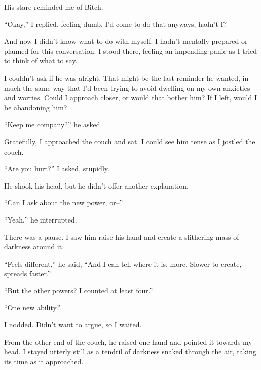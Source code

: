 His stare reminded me of Bitch.



``Okay,'' I replied, feeling dumb. I'd come to do that anyways, hadn't I?



And now I didn't know what to do with myself.  I hadn't mentally prepared or planned for this conversation.  I stood there, feeling an impending panic as I tried to think of what to say.



I couldn't ask if he was alright.  That might be the last reminder he wanted, in much the same way that I'd been trying to avoid dwelling on my own anxieties and worries.  Could I approach closer, or would that bother him?  If I left, would I be abandoning him?



``Keep me company?'' he asked.



Gratefully, I approached the couch and sat.  I could see him tense as I jostled the couch.



``Are you hurt?''  I asked, stupidly.



He shook his head, but he didn't offer another explanation.



``Can I ask about the new power, or--''



``Yeah,'' he interrupted.



There was a pause.  I saw him raise his hand and create a slithering mass of darkness around it.



``Feels different,'' he said, ``And I can tell where it is, more.  Slower to create, spreads faster.''



``But the other powers?  I counted at least four.''



``One new ability.''



I nodded.  Didn't want to argue, so I waited.



From the other end of the couch, he raised one hand and pointed it towards my head.  I stayed utterly still as a tendril of darkness snaked through the air, taking its time as it approached.



